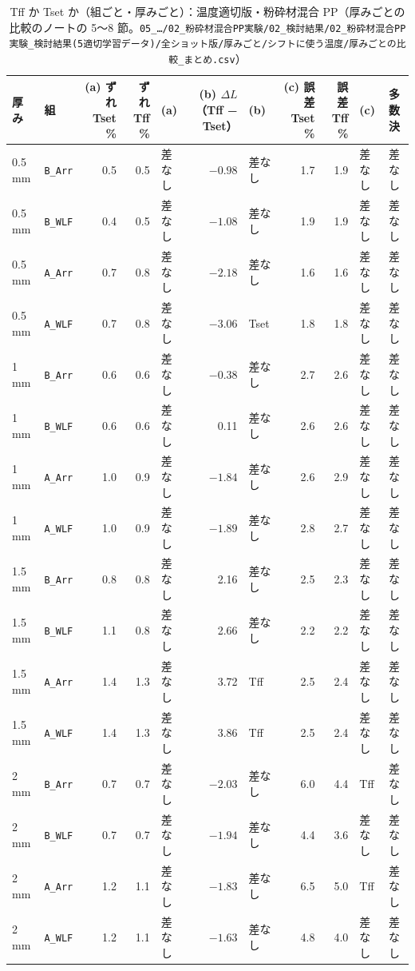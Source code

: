 \documentclass[paper=a4paper,landscape,fontsize=10pt,line_length=62zw,number_of_lines=34]{jlreq}
\begin{document}
\begin{table}[H]\centering\footnotesize
\caption{Tff か Tset か（組ごと・厚みごと）：温度適切版・粉砕材混合 PP（厚みごとの比較のノートの 5〜8 節。\texttt{05\_\allowbreak{}…/\allowbreak{}02\_\allowbreak{}粉砕材混合PP実験/\allowbreak{}02\_\allowbreak{}検討結果/\allowbreak{}02\_\allowbreak{}粉砕材混合PP実験\_\allowbreak{}検討結果(5適切学習データ)/\allowbreak{}全ショット版/\allowbreak{}厚みごと/\allowbreak{}シフトに使う温度/\allowbreak{}厚みごとの比較\_\allowbreak{}まとめ.csv}）}
\begin{tabular}{llrrlrlrrll}
\toprule
厚み & 組 & (a) ずれ Tset \% & ずれ Tff \% & (a) & (b) $\Delta L$（Tff − Tset） & (b) & (c) 誤差 Tset \% & 誤差 Tff \% & (c) & 多数決 \\
\midrule
0.5 mm & \texttt{B\_\allowbreak{}Arr} & 0.5 & 0.5 & 差なし & $-0.98$ & 差なし & 1.7 & 1.9 & 差なし & 差なし \\
0.5 mm & \texttt{B\_\allowbreak{}WLF} & 0.4 & 0.5 & 差なし & $-1.08$ & 差なし & 1.9 & 1.9 & 差なし & 差なし \\
0.5 mm & \texttt{A\_\allowbreak{}Arr} & 0.7 & 0.8 & 差なし & $-2.18$ & 差なし & 1.6 & 1.6 & 差なし & 差なし \\
0.5 mm & \texttt{A\_\allowbreak{}WLF} & 0.7 & 0.8 & 差なし & $-3.06$ & Tset & 1.8 & 1.8 & 差なし & 差なし \\
1 mm & \texttt{B\_\allowbreak{}Arr} & 0.6 & 0.6 & 差なし & $-0.38$ & 差なし & 2.7 & 2.6 & 差なし & 差なし \\
1 mm & \texttt{B\_\allowbreak{}WLF} & 0.6 & 0.6 & 差なし & 0.11 & 差なし & 2.6 & 2.6 & 差なし & 差なし \\
1 mm & \texttt{A\_\allowbreak{}Arr} & 1.0 & 0.9 & 差なし & $-1.84$ & 差なし & 2.6 & 2.9 & 差なし & 差なし \\
1 mm & \texttt{A\_\allowbreak{}WLF} & 1.0 & 0.9 & 差なし & $-1.89$ & 差なし & 2.8 & 2.7 & 差なし & 差なし \\
1.5 mm & \texttt{B\_\allowbreak{}Arr} & 0.8 & 0.8 & 差なし & 2.16 & 差なし & 2.5 & 2.3 & 差なし & 差なし \\
1.5 mm & \texttt{B\_\allowbreak{}WLF} & 1.1 & 0.8 & 差なし & 2.66 & 差なし & 2.2 & 2.2 & 差なし & 差なし \\
1.5 mm & \texttt{A\_\allowbreak{}Arr} & 1.4 & 1.3 & 差なし & 3.72 & Tff & 2.5 & 2.4 & 差なし & 差なし \\
1.5 mm & \texttt{A\_\allowbreak{}WLF} & 1.4 & 1.3 & 差なし & 3.86 & Tff & 2.5 & 2.4 & 差なし & 差なし \\
2 mm & \texttt{B\_\allowbreak{}Arr} & 0.7 & 0.7 & 差なし & $-2.03$ & 差なし & 6.0 & 4.4 & Tff & 差なし \\
2 mm & \texttt{B\_\allowbreak{}WLF} & 0.7 & 0.7 & 差なし & $-1.94$ & 差なし & 4.4 & 3.6 & 差なし & 差なし \\
2 mm & \texttt{A\_\allowbreak{}Arr} & 1.2 & 1.1 & 差なし & $-1.83$ & 差なし & 6.5 & 5.0 & Tff & 差なし \\
2 mm & \texttt{A\_\allowbreak{}WLF} & 1.2 & 1.1 & 差なし & $-1.63$ & 差なし & 4.8 & 4.0 & 差なし & 差なし \\
\bottomrule
\end{tabular}
\end{table}
\clearpage
\end{document}
